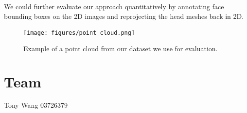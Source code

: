 \documentclass[a4paper,pagesize 10pt]{scrartcl}
\begin{document}
We could further evaluate our approach quantitatively by annotating face bounding boxes on the 2D images and reprojecting the head meshes back in 2D.

\begin{figure}[!ht]
    \centering
    \texttt{[image: figures/point\_cloud.png]}
    \caption{Example of a point cloud from our dataset we use for evaluation.}
    \label{fig:example_pcd}
\end{figure}



\section{Team}
Tony Wang 03726379


{\small
	
	
}
\end{document}
